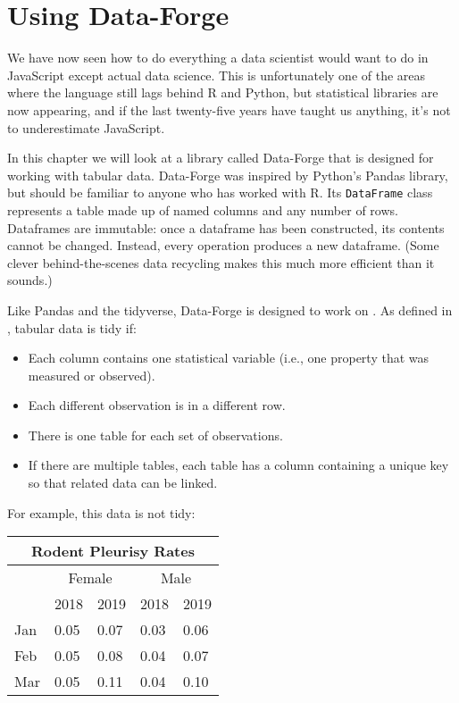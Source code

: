 \chapter{Using Data-Forge}\label{s:dataforge}

We have now seen how to do everything a data scientist would want to do in JavaScript
except actual data science.
This is unfortunately one of the areas where the language still lags behind R and Python,
but statistical libraries are now appearing,
and if the last twenty-five years have taught us anything,
it's not to underestimate JavaScript.

In this chapter we will look at a library called Data-Forge
that is designed for working with tabular data.
Data-Forge was inspired by Python's Pandas library,
but should be familiar to anyone who has worked with R.
Its \texttt{DataFrame} class represents a table made up of named columns
and any number of rows.
Dataframes are immutable:
once a dataframe has been constructed,
its contents cannot be changed.
Instead,
every operation produces a new dataframe.
(Some clever behind-the-scenes data recycling makes this much more efficient than it sounds.)

Like Pandas and the tidyverse,
Data-Forge is designed to work on .
As defined in \cite{Wick2014}, tabular data is tidy if:

\begin{itemize}
\item
  Each column contains one statistical variable
  (i.e., one property that was measured or observed).

\item
  Each different observation is in a different row.

\item
  There is one table for each set of observations.

\item
  If there are multiple tables,
  each table has a column containing a unique key
  so that related data can be linked.
\end{itemize}

For example,
this data is not tidy:

\begin{longtable}{|l|l|l|l|l|}
  \hline
  \multicolumn{5}{|c|}{Rodent Pleurisy Rates} \\
  \hline
  & \multicolumn{2}{c|}{Female} & \multicolumn{2}{c|}{Male} \\
  \hline
  & 2018 & 2019 & 2018 & 2019 \\
  \hline
  Jan & 0.05 & 0.07 & 0.03 & 0.06 \\
  \hline
  Feb & 0.05 & 0.08 & 0.04 & 0.07 \\
  \hline
  Mar & 0.05 & 0.11 & 0.04 & 0.10 \\
  \hline
\end{longtable}

